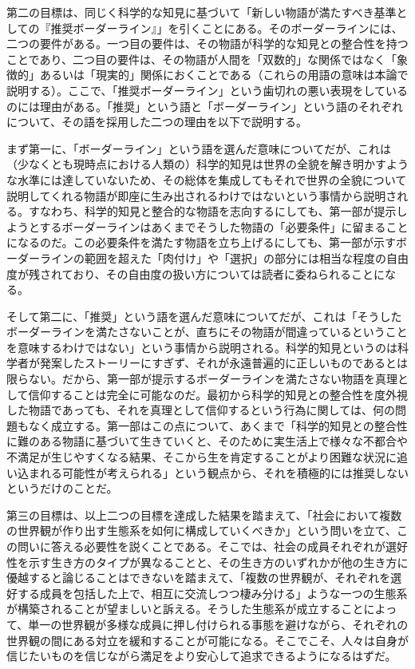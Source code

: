 第二の目標は、同じく科学的な知見に基づいて「新しい物語が満たすべき基準としての『推奨ボーダーライン』」を引くことにある。そのボーダーラインには、二つの要件がある。一つ目の要件は、その物語が科学的な知見との整合性を持つことであり、二つ目の要件は、その物語が人間を「双数的」な関係ではなく「象徴的」あるいは「現実的」関係におくことである（これらの用語の意味は本論で説明する）。ここで、「推奨ボーダーライン」という歯切れの悪い表現をしているのには理由がある。「推奨」という語と「ボーダーライン」という語のそれぞれについて、その語を採用した二つの理由を以下で説明する。

まず第一に、「ボーダーライン」という語を選んだ意味についてだが、これは（少なくとも現時点における人類の）科学的知見は世界の全貌を解き明かすような水準には達していないため、その総体を集成してもそれで世界の全貌について説明してくれる物語が即座に生み出されるわけではないという事情から説明される。すなわち、科学的知見と整合的な物語を志向するにしても、第一部が提示しようとするボーダーラインはあくまでそうした物語の「必要条件」に留まることになるのだ。この必要条件を満たす物語を立ち上げるにしても、第一部が示すボーダーラインの範囲を超えた「肉付け」や「選択」の部分には相当な程度の自由度が残されており、その自由度の扱い方については読者に委ねられることになる。

そして第二に、「推奨」という語を選んだ意味についてだが、これは「そうしたボーダーラインを満たさないことが、直ちにその物語が間違っているということを意味するわけではない」という事情から説明される。科学的知見というのは科学者が発案したストーリーにすぎず、それが永遠普遍的に正しいものであるとは限らない。だから、第一部が提示するボーダーラインを満たさない物語を真理として信仰することは完全に可能なのだ。最初から科学的知見との整合性を度外視した物語であっても、それを真理として信仰するという行為に関しては、何の問題もなく成立する。第一部はこの点について、あくまで「科学的知見との整合性に難のある物語に基づいて生きていくと、そのために実生活上で様々な不都合や不満足が生じやすくなる結果、そこから生を肯定することがより困難な状況に追い込まれる可能性が考えられる」という観点から、それを積極的には推奨しないというだけのことだ。

第三の目標は、以上二つの目標を達成した結果を踏まえて、「社会において複数の世界観が作り出す生態系を如何に構成していくべきか」という問いを立て、この問いに答える必要性を説くことである。そこでは、社会の成員それぞれが選好性を示す生き方のタイプが異なることと、その生き方のいずれかが他の生き方に優越すると論じることはできないを踏まえて、「複数の世界観が、それぞれを選好する成員を包括した上で、相互に交流しつつ棲み分ける」ような一つの生態系が構築されることが望ましいと訴える。そうした生態系が成立することによって、単一の世界観が多様な成員に押し付けられる事態を避けながら、それぞれの世界観の間にある対立を緩和することが可能になる。そこでこそ、人々は自身が信じたいものを信じながら満足をより安心して追求できるようになるはずだ。

